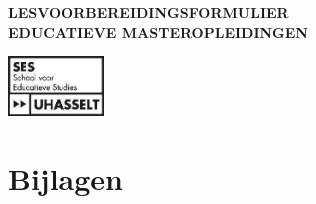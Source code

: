 \documentclass{uhlvb}
\newlength{\msize}
\begin{document}
    \begin{minipage}[b]{\msize}
        \LARGE{\textbf{\color{red} LESVOORBEREIDINGSFORMULIER \\ EDUCATIEVE MASTEROPLEIDINGEN}}
    \end{minipage}
    \begin{minipage}[b]{1in}
        \includegraphics[width=1in]{UHasselt_Logo.jpg}
    \end{minipage}
    
    
    
    
    
    
    \section{Bijlagen}
\end{document}
